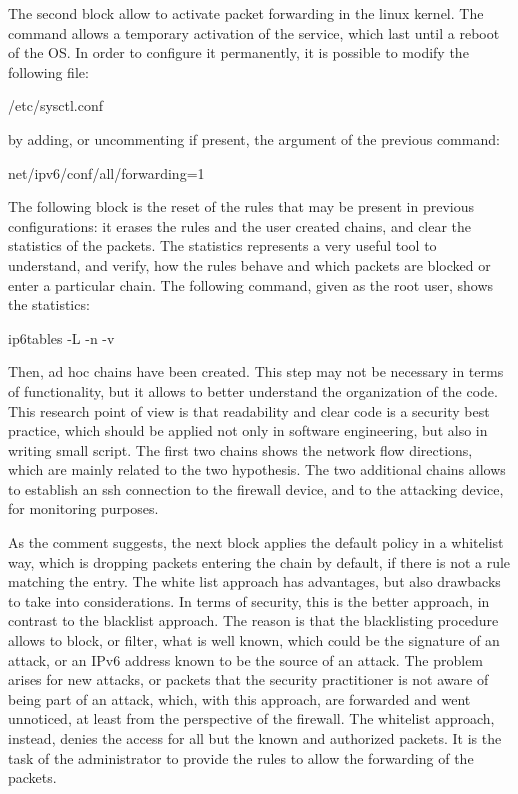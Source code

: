 \documentclass[12pt]{article}
\begin{document}
The second block allow to activate packet forwarding in the linux kernel. The command allows a temporary activation of the service, which last until a reboot of the OS. In order to configure it permanently, it is possible to modify the following file:

/etc/sysctl.conf

by adding, or uncommenting if present, the argument of the previous command: 

net/ipv6/conf/all/forwarding=1

The following block is the reset of the rules that may be present in previous configurations: it erases the rules and the user created chains, and clear the statistics of the packets. The statistics represents a very useful tool to understand, and verify, how the rules behave and which packets are blocked or enter a particular chain. The following command, given as the root user, shows the statistics:

ip6tables -L -n -v

Then, ad hoc chains have been created. This step may not be necessary in terms of functionality, but it allows to better understand the organization of the code. This research point of view is that readability and clear code is a security best practice, which should be applied not only in software engineering, but also in writing small script. The first two chains shows the network flow directions, which are mainly related to the two hypothesis. The two additional chains allows to establish an ssh connection to the firewall device, and to the attacking device, for monitoring purposes.

As the comment suggests, the next block applies the default policy in a whitelist way, which is dropping packets entering the chain by default, if there is not a rule matching the entry. The white list approach has advantages, but also drawbacks to take into considerations. In terms of security, this is the better approach, in contrast to the blacklist approach. The reason is that the blacklisting procedure allows to block, or filter, what is well known, which could be the signature of an attack, or an IPv6 address known to be the source of an attack. The problem arises for new attacks, or packets that the security practitioner is not aware of being part of an attack, which, with this approach, are forwarded and went unnoticed, at least from the perspective of the firewall. The whitelist approach, instead, denies the access for all but the known and authorized packets. It is the task of the administrator to provide the rules to allow the forwarding of the packets.
\end{document}
